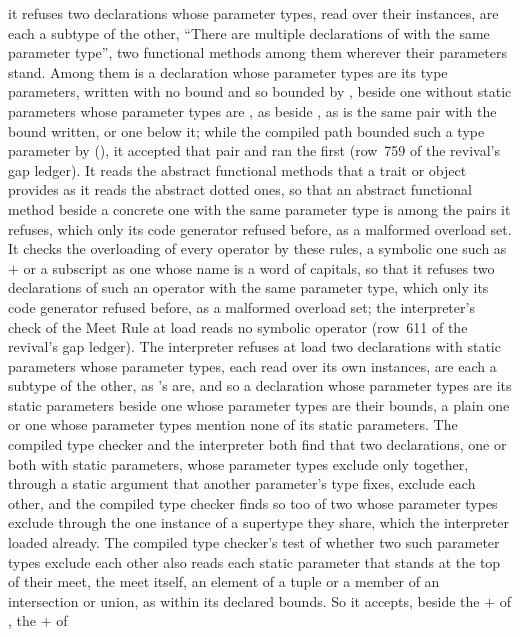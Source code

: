 \begin{description}
it refuses two declarations whose parameter types, read over their instances,
are each a subtype of the other, ``There are multiple declarations of 
with the same parameter type'', two functional methods among them wherever their
 parameters stand.
Among them is a declaration whose parameter types are its type parameters,
written with no bound and so bounded by , beside one without static
parameters whose parameter types are , as
 beside
, as is the same pair with the bound written,
 or one below it; while the compiled path bounded such a type
parameter by  (), it accepted that pair and
ran the first (row~759 of the revival's gap ledger).
It reads the abstract functional methods that a trait or object provides as it
reads the abstract dotted ones, so that an abstract functional method beside a
concrete one with the same parameter type is among the pairs it refuses, which
only its code generator refused before, as a malformed overload set.
It checks the overloading of every operator by these rules, a symbolic one such
as $+$ or a subscript as one whose name is a word of capitals, so that it refuses
two declarations of such an operator with the same parameter type, which only its
code generator refused before, as a malformed overload set; the interpreter's
check of the Meet Rule at load reads no symbolic operator (row~611 of the
revival's gap ledger).
The interpreter refuses at load two declarations with static parameters whose
parameter types, each read over its own instances, are each a subtype of the
other, as 's are, and so a declaration whose parameter types are its
static parameters beside one whose parameter types are their bounds, a plain one
or one whose parameter types mention none of its static parameters.
The compiled type checker and the interpreter both find that two declarations,
one or both with static parameters, whose parameter types exclude only together,
through a static argument that another parameter's type fixes, exclude each
other, and the compiled type checker finds so too of two whose parameter types
exclude through the one instance of a supertype they share, which the
interpreter loaded already.
The compiled type checker's test of whether two such parameter types exclude
each other also reads each static parameter that stands at the top of their
meet, the meet itself, an element of a tuple or a member of an intersection or
union, as within its declared bounds.
So it accepts, beside the $+$ of , the $+$ of \library\

\end{description}
